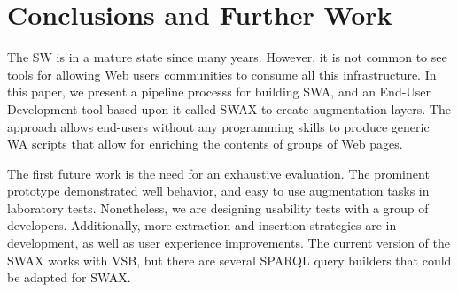 \documentclass[runningheads]{llncs}
\newcommand{\SWAT}{SWAF}
\begin{document}
\section{Conclusions and Further Work}
\label{sec-conclusions}


The SW is in a mature state since many years. However, it is not common to see tools for allowing Web users communities to consume all this infrastructure. In this paper, we present a pipeline processs for building SWA, and an End-User Development tool based upon it called SWAX to create augmentation layers. The approach allows end-users without any programming skills to produce generic WA scripts that allow for enriching the contents of groups of Web pages.

The first future work is the need for an exhaustive evaluation. The prominent prototype demonstrated well behavior, and easy to use augmentation tasks in laboratory tests. Nonetheless, we are designing usability tests with a group of developers. Additionally, more extraction and insertion strategies are in development, as well as user experience improvements. The current version of the SWAX works with VSB, but there are several SPARQL query builders that could be adapted for SWAX.


%
%
%
% 
% 
%


\end{document}
